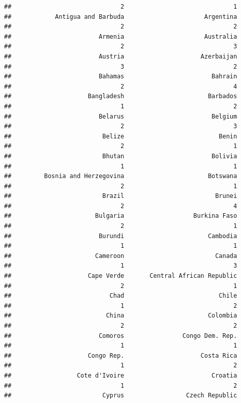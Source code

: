 \documentclass[
]{article}
\begin{document}
\begin{verbatim}
##                              2                              1 
##            Antigua and Barbuda                      Argentina 
##                              2                              2 
##                        Armenia                      Australia 
##                              2                              3 
##                        Austria                     Azerbaijan 
##                              3                              2 
##                        Bahamas                        Bahrain 
##                              2                              4 
##                     Bangladesh                       Barbados 
##                              1                              2 
##                        Belarus                        Belgium 
##                              2                              3 
##                         Belize                          Benin 
##                              2                              1 
##                         Bhutan                        Bolivia 
##                              1                              1 
##         Bosnia and Herzegovina                       Botswana 
##                              2                              1 
##                         Brazil                         Brunei 
##                              2                              4 
##                       Bulgaria                   Burkina Faso 
##                              2                              1 
##                        Burundi                       Cambodia 
##                              1                              1 
##                       Cameroon                         Canada 
##                              1                              3 
##                     Cape Verde       Central African Republic 
##                              2                              1 
##                           Chad                          Chile 
##                              1                              2 
##                          China                       Colombia 
##                              2                              2 
##                        Comoros                Congo Dem. Rep. 
##                              1                              1 
##                     Congo Rep.                     Costa Rica 
##                              1                              2 
##                  Cote d'Ivoire                        Croatia 
##                              1                              2 
##                         Cyprus                 Czech Republic 

\end{verbatim}
\end{document}
